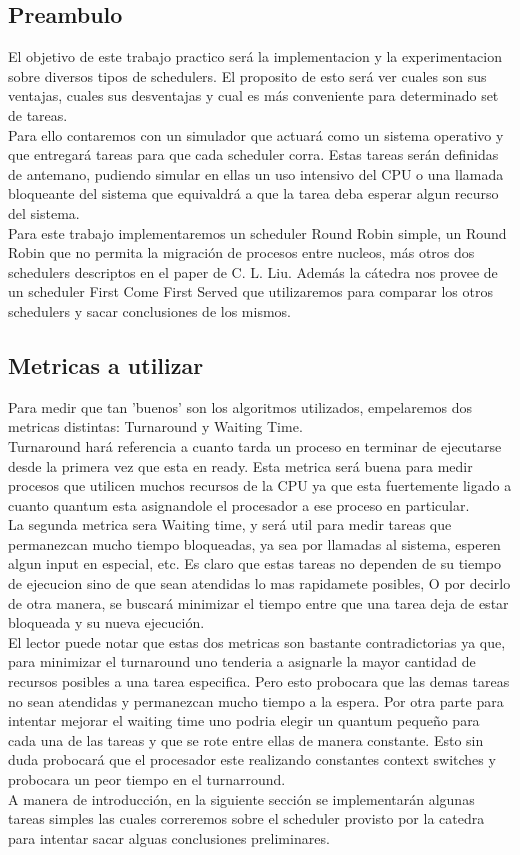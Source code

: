 \subsection{Preambulo}
El objetivo de este trabajo practico será la implementacion y la experimentacion sobre diversos tipos de schedulers. El proposito de esto será ver cuales son sus ventajas, cuales sus desventajas y cual es más conveniente para determinado set de tareas.
\\
Para ello contaremos con un simulador que actuará como un sistema operativo y que entregará tareas para que cada scheduler corra. Estas tareas serán definidas de antemano, pudiendo simular en ellas un uso intensivo del CPU o una llamada bloqueante del sistema que equivaldrá a que la tarea deba esperar algun recurso del sistema.
\\
Para este trabajo implementaremos un scheduler Round Robin simple, un Round Robin que no permita la migración de procesos entre nucleos, más otros dos schedulers descriptos en el paper de C. L. Liu. Además la cátedra nos provee de un scheduler First Come First Served que utilizaremos para comparar los otros schedulers y sacar conclusiones de los mismos.
\subsection{Metricas a utilizar}

Para medir que tan 'buenos' son los algoritmos utilizados, empelaremos dos metricas distintas: Turnaround y Waiting Time.
\\
Turnaround hará referencia a cuanto tarda un proceso en terminar de ejecutarse desde la primera vez que esta en ready. Esta metrica será buena para medir procesos que utilicen muchos recursos de la CPU ya que esta fuertemente ligado a cuanto quantum esta asignandole el procesador a ese proceso en particular.
\\
La segunda metrica sera Waiting time, y será util para medir tareas que permanezcan mucho tiempo bloqueadas, ya sea por llamadas al sistema, esperen algun input en especial, etc. Es claro que estas tareas no dependen de su tiempo de ejecucion sino de que sean atendidas lo mas rapidamete posibles, O por decirlo de otra manera, se buscará minimizar el tiempo entre que una tarea deja de estar bloqueada y su nueva ejecución.
\\
El lector puede notar que estas dos metricas son bastante contradictorias ya que, para minimizar el turnaround uno tenderia a asignarle la mayor cantidad de recursos posibles a una tarea especifica. Pero esto probocara que las demas tareas no sean atendidas y permanezcan mucho tiempo a la espera. Por otra parte para intentar mejorar el waiting time uno podria elegir un quantum pequeño para cada una de las tareas y que se rote entre ellas de manera constante. Esto sin duda probocará que el procesador este realizando constantes context switches y probocara un peor tiempo en el turnarround.
\\
A manera de introducción, en la siguiente sección se implementarán algunas tareas simples las cuales correremos sobre el scheduler provisto por la catedra para intentar sacar alguas conclusiones preliminares.
